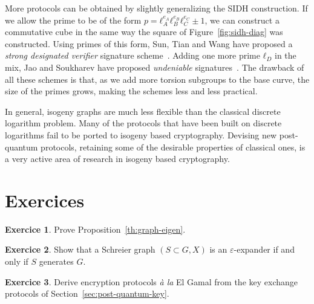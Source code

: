 \documentclass[10pt]{article}
\theoremstyle{plain}
\theoremstyle{definition}
\newtheorem{exercice}{Exercice}[part]
\begin{document}
More protocols can be obtained by slightly generalizing the SIDH
construction. %
If we allow the prime to be of the form
$p=ℓ_A^{e_A}ℓ_B^{e_B}ℓ_C^{e_C}±1$, we can construct a commutative cube
in the same way the square of Figure~\ref{fig:sidh-diag} was
constructed. %
Using primes of this form, Sun, Tian and Wang have proposed a
\emph{strong designated verifier} signature
scheme~\cite{sun2012toward}. %
Adding one more prime $ℓ_D$ in the mix, Jao and Soukharev have
proposed \emph{undeniable} signatures~\cite{jao2014isogeny}.
The drawback of all these schemes is that, as we add more torsion
subgroups to the base curve, the size of the primes grows, making the
schemes less and less practical. %

In general, isogeny graphs are much less flexible than the classical
discrete logarithm problem. %
Many of the protocols that have been built on discrete logarithms fail
to be ported to isogeny based cryptography. %
Devising new post-quantum protocols, retaining some of the desirable
properties of classical ones, is a very active area of research in
isogeny based cryptography.


\section*{Exercices}

\begin{exercice}
  Prove Proposition~\ref{th:graph-eigen}.
\end{exercice}

\begin{exercice}
  \label{ex:schreier}
  Show that a Schreier graph $(S⊂G, X)$ is an $ε$-expander if and only
  if $S$ generates $G$.
\end{exercice}

\begin{exercice}
  \label{ex:elgamal}
  Derive encryption protocols \emph{\`a la} El Gamal from the key
  exchange protocols of Section~\ref{sec:post-quantum-key}.
\end{exercice}

\clearpage


\end{document}
